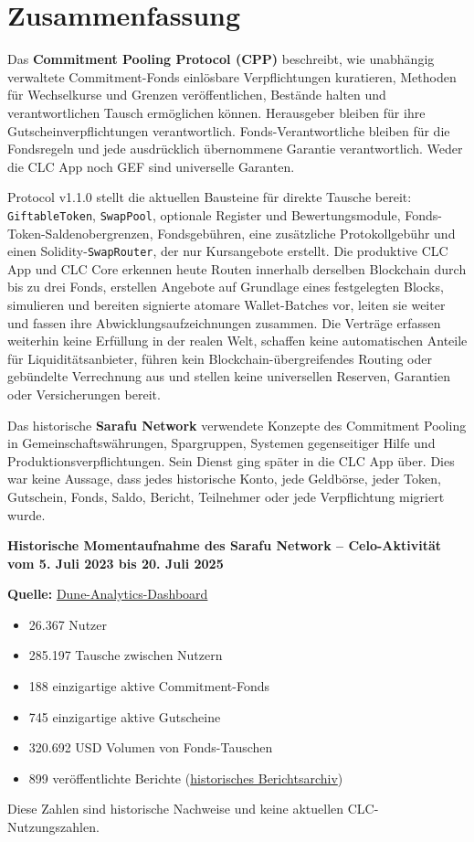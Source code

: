 \documentclass[11pt]{article}
\begin{document}
\section*{Zusammenfassung}

Das \textbf{Commitment Pooling Protocol (CPP)} beschreibt, wie unabhängig verwaltete Commitment-Fonds einlösbare Verpflichtungen kuratieren, Methoden für Wechselkurse und Grenzen veröffentlichen, Bestände halten und verantwortlichen Tausch ermöglichen können. Herausgeber bleiben für ihre Gutscheinverpflichtungen verantwortlich. Fonds-Verantwortliche bleiben für die Fondsregeln und jede ausdrücklich übernommene Garantie verantwortlich. Weder die CLC App noch GEF sind universelle Garanten.

Protocol v1.1.0 stellt die aktuellen Bausteine für direkte Tausche bereit: \texttt{GiftableToken}, \texttt{SwapPool}, optionale Register und Bewertungsmodule, Fonds-Token-Saldenobergrenzen, Fondsgebühren, eine zusätzliche Protokollgebühr und einen Solidity-\texttt{SwapRouter}, der nur Kursangebote erstellt. Die produktive CLC App und CLC Core erkennen heute Routen innerhalb derselben Blockchain durch bis zu drei Fonds, erstellen Angebote auf Grundlage eines festgelegten Blocks, simulieren und bereiten signierte atomare Wallet-Batches vor, leiten sie weiter und fassen ihre Abwicklungsaufzeichnungen zusammen. Die Verträge erfassen weiterhin keine Erfüllung in der realen Welt, schaffen keine automatischen Anteile für Liquiditätsanbieter, führen kein Blockchain-übergreifendes Routing oder gebündelte Verrechnung aus und stellen keine universellen Reserven, Garantien oder Versicherungen bereit.

Das historische \textbf{Sarafu Network} verwendete Konzepte des Commitment Pooling in Gemeinschaftswährungen, Spargruppen, Systemen gegenseitiger Hilfe und Produktionsverpflichtungen. Sein Dienst ging später in die CLC App über. Dies war keine Aussage, dass jedes historische Konto, jede Geldbörse, jeder Token, Gutschein, Fonds, Saldo, Bericht, Teilnehmer oder jede Verpflichtung migriert wurde.

\textbf{Historische Momentaufnahme des Sarafu Network -- Celo-Aktivität vom 5. Juli 2023 bis 20. Juli 2025}

\textbf{Quelle:} \href{https://dune.com/grassrootseconomics/sarafu-network}{Dune-Analytics-Dashboard}

\begin{itemize}[leftmargin=*]
\item 26.367 Nutzer
\item 285.197 Tausche zwischen Nutzern
\item 188 einzigartige aktive Commitment-Fonds
\item 745 einzigartige aktive Gutscheine
\item 320.692 USD Volumen von Fonds-Tauschen
\item 899 veröffentlichte Berichte (\href{https://sarafu.network/reports}{historisches Berichtsarchiv})
\end{itemize}
Diese Zahlen sind historische Nachweise und keine aktuellen CLC-Nutzungszahlen.
\end{document}
